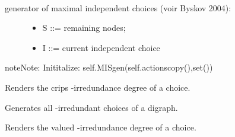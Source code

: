 \documentclass[letterpaper,10pt,english]{sphinxmanual}
\begin{document}
\begin{fulllineitems}
\begin{fulllineitems}
\label{techDoc:digraphs.Digraph.MISgen}~\begin{description}
\item[{generator of maximal independent choices (voir Byskov 2004):}] \leavevmode\begin{itemize}
\item {} 
S ::= remaining nodes;

\item {} 
I ::= current independent choice

\end{itemize}

\end{description}

\begin{notice}{note}{Note:}
Inititalize: self.MISgen(self.actionscopy(),set())
\end{notice}

\end{fulllineitems}


\begin{fulllineitems}
\label{techDoc:digraphs.Digraph.absirred}
Renders the crips -irredundance degree of a choice.

\end{fulllineitems}


\begin{fulllineitems}
\label{techDoc:digraphs.Digraph.absirredundant}
Generates all -irredundant choices of a digraph.

\end{fulllineitems}


\begin{fulllineitems}
\label{techDoc:digraphs.Digraph.absirredval}
Renders the valued -irredundance degree of a choice.

\end{fulllineitems}



\end{fulllineitems}
\end{document}
